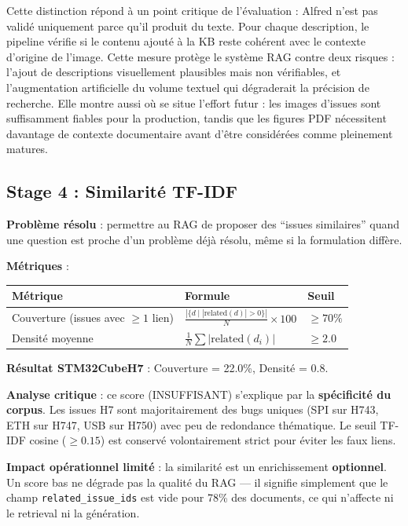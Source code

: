 \documentclass[12pt,a4paper]{report}
\begin{document}
Cette distinction répond à un point critique de l'évaluation : Alfred n'est pas validé uniquement parce qu'il produit du texte. Pour chaque description, le pipeline vérifie si le contenu ajouté à la KB reste cohérent avec le contexte d'origine de l'image. Cette mesure protège le système RAG contre deux risques : l'ajout de descriptions visuellement plausibles mais non vérifiables, et l'augmentation artificielle du volume textuel qui dégraderait la précision de recherche. Elle montre aussi où se situe l'effort futur : les images d'issues sont suffisamment fiables pour la production, tandis que les figures PDF nécessitent davantage de contexte documentaire avant d'être considérées comme pleinement matures.

\subsection{Stage 4 : Similarité TF-IDF}
\label{sec:eval_similarity}

\textbf{Problème résolu} : permettre au RAG de proposer des ``issues similaires'' quand une question est proche d'un problème déjà résolu, même si la formulation diffère.

\textbf{Métriques} :
\begin{longtable}{p{5cm}p{5.5cm}p{2.5cm}}
\toprule
\textbf{Métrique} & \textbf{Formule} & \textbf{Seuil} \\
\midrule
Couverture (issues avec $\geq 1$ lien) & $\frac{|\{d \mid |\text{related}(d)| > 0\}|}{N} \times 100$ & $\geq 70\%$ \\
Densité moyenne & $\frac{1}{N}\sum |\text{related}(d_i)|$ & $\geq 2.0$ \\
\bottomrule
\end{longtable}

\textbf{Résultat STM32CubeH7} : Couverture = 22.0\%, Densité = 0.8.

\textbf{Analyse critique} : ce score (INSUFFISANT) s'explique par la \textbf{spécificité du corpus}. Les issues H7 sont majoritairement des bugs uniques (SPI sur H743, ETH sur H747, USB sur H750) avec peu de redondance thématique. Le seuil TF-IDF cosine ($\geq 0.15$) est conservé volontairement strict pour éviter les faux liens.

\textbf{Impact opérationnel limité} : la similarité est un enrichissement \textbf{optionnel}. Un score bas ne dégrade pas la qualité du RAG --- il signifie simplement que le champ \texttt{related\_issue\_ids} est vide pour 78\% des documents, ce qui n'affecte ni le retrieval ni la génération.
\end{document}
